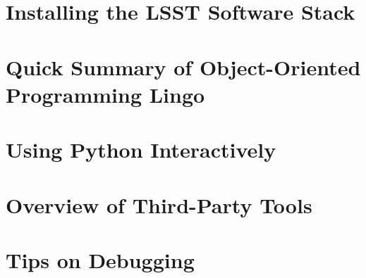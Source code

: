 \documentclass[oneside]{book}
\begin{document}
\chapter{Installing the LSST Software Stack\label{appendix-stackinstall}}


\chapter{Quick Summary of Object-Oriented Programming Lingo\label{appendix-lingo}}


\chapter{Using Python Interactively\label{appendix-interactivePython}}


\chapter{Overview of Third-Party Tools\label{appendix-thirdparty}}


\chapter{Tips on Debugging\label{appendix-debugging}}

\end{document}
